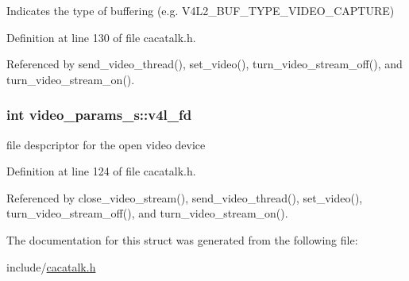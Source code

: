 \-Indicates the type of buffering (e.\-g. \-V4\-L2\-\_\-\-B\-U\-F\-\_\-\-T\-Y\-P\-E\-\_\-\-V\-I\-D\-E\-O\-\_\-\-C\-A\-P\-T\-U\-R\-E) 



\-Definition at line 130 of file cacatalk.\-h.



\-Referenced by send\-\_\-video\-\_\-thread(), set\-\_\-video(), turn\-\_\-video\-\_\-stream\-\_\-off(), and turn\-\_\-video\-\_\-stream\-\_\-on().

\hypertarget{structvideo__params__s_a5ad62fa189f34607d1dbb4e693a81cfd}{
\subsubsection[{v4l\-\_\-fd}]{\setlength{\rightskip}{0pt plus 5cm}int {\bf video\-\_\-params\-\_\-s\-::v4l\-\_\-fd}}}\label{structvideo__params__s_a5ad62fa189f34607d1dbb4e693a81cfd}


file despcriptor for the open video device 



\-Definition at line 124 of file cacatalk.\-h.



\-Referenced by close\-\_\-video\-\_\-stream(), send\-\_\-video\-\_\-thread(), set\-\_\-video(), turn\-\_\-video\-\_\-stream\-\_\-off(), and turn\-\_\-video\-\_\-stream\-\_\-on().



\-The documentation for this struct was generated from the following file\-:\begin{DoxyCompactItemize}
\item 
include/\hyperlink{cacatalk_8h}{cacatalk.\-h}\end{DoxyCompactItemize}
